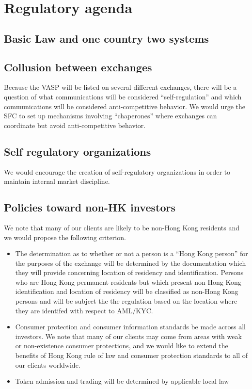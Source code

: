 \section{Regulatory agenda}

\subsection{Basic Law and one country two systems}

\subsection{Collusion between exchanges}

Because the VASP will be listed on several different exchanges, there
will be a question of what communications will be considered
``self-regulation'' and which communications will be considered
anti-competitive behavior.  We would urge the SFC to set up mechanisms
involving ``chaperones'' where exchanges can coordinate but avoid
anti-competitive behavior.

\subsection{Self regulatory organizations}
We would encourage the creation of self-regulatory organizations in
order to maintain internal market discipline.  

\subsection{Policies toward non-HK investors}

We note that many of our clients are likely to be non-Hong Kong
residents and we would propose the following criterion.


\begin{itemize}
  \item The determination as to whether or not a person is a ``Hong
    Kong person'' for the purposes of the exchange will be determined
    by the documentation which they will provide concerning location
    of residency and identification.  Persons who are Hong Kong
    permanent residents but which present non-Hong Kong identification and
    location of residency will be classified as non-Hong Kong persons
    and will be subject the the regulation based on the location where
    they are identifed with respect to AML/KYC.
  \item Consumer protection and consumer information standards be made
    across all investors.  We note that many of our clients may come
    from areas with weak or non-existence consumer protections, and we
    would like to extend the benefits of Hong Kong rule of law and
    consumer protection standards to all of our clients worldwide.
  \item Token admission and trading will be determined by applicable
    local law
\end{itemize}
